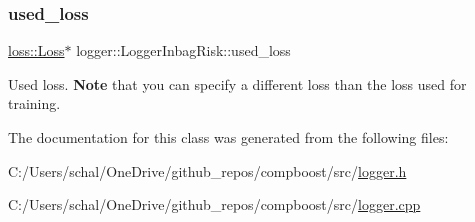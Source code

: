 \subsubsection{\texorpdfstring{used\+\_\+loss}{used\_loss}}
{\footnotesize\ttfamily \mbox{\hyperlink{classloss_1_1_loss}{loss\+::\+Loss}}$\ast$ logger\+::\+Logger\+Inbag\+Risk\+::used\+\_\+loss\hspace{0.3cm}{\ttfamily [private]}}



Used loss. {\bfseries Note} that you can specify a different loss than the loss used for training. 



The documentation for this class was generated from the following files\+:\begin{DoxyCompactItemize}
\item 
C\+:/\+Users/schal/\+One\+Drive/github\+\_\+repos/compboost/src/\mbox{\hyperlink{logger_8h}{logger.\+h}}\item 
C\+:/\+Users/schal/\+One\+Drive/github\+\_\+repos/compboost/src/\mbox{\hyperlink{logger_8cpp}{logger.\+cpp}}\end{DoxyCompactItemize}
